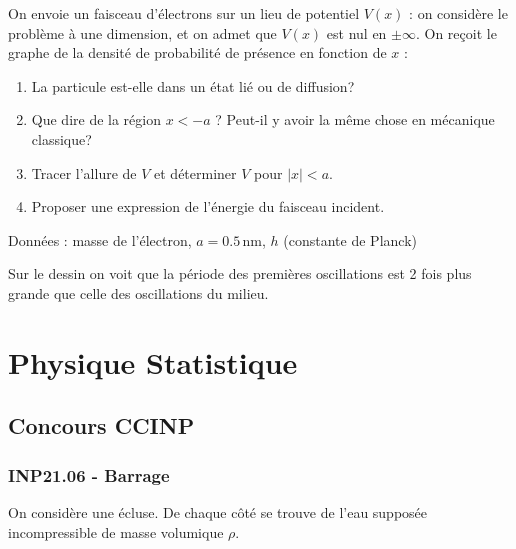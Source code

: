 On envoie un faisceau d'électrons sur un lieu de potentiel $V(x)$ : on considère le problème à une dimension, et on admet que $V(x)$ est nul en $\pm \infty$. On reçoit le graphe de la densité de probabilité de présence en fonction de $x$ :

\begin{center}
\end{center}

\begin{enumerate}
\item La particule est-elle dans un état lié ou de diffusion?
\item Que dire de la région $x < -a$ ? Peut-il y avoir la même chose en mécanique classique?
\item Tracer l'allure de $V$ et déterminer $V$ pour $|x| < a$.
\item Proposer une expression de l'énergie du faisceau incident.
\end{enumerate}

Données : masse de l'électron, $a = 0.5\,\text{nm}$, $h$ (constante de Planck)

Sur le dessin on voit que la période des premières oscillations est 2 fois plus grande que celle des oscillations du milieu.

\newpage
\section*{Physique Statistique}
\subsection*{Concours CCINP}

\subsubsection*{INP21.06 - Barrage  \corrige}

\begin{center}
\end{center}

On considère une écluse. De chaque côté se trouve de l'eau supposée incompressible de masse volumique $\rho$.

